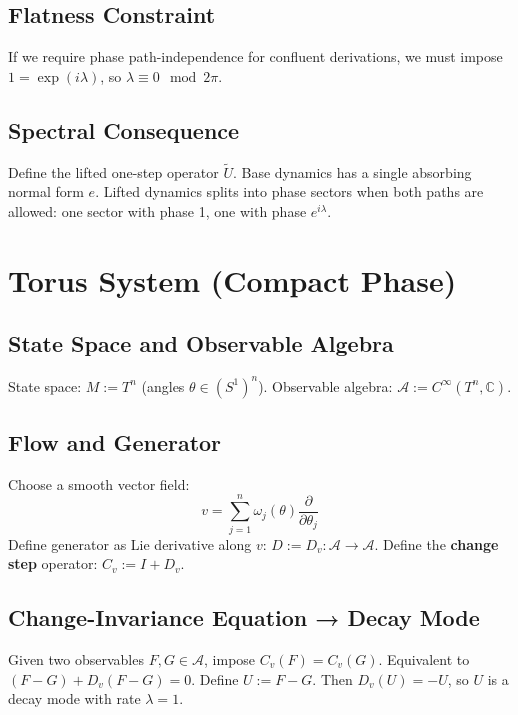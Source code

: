 \documentclass[12pt, oneside]{article}
\begin{document}
\subsection{Flatness Constraint}

If we require phase path-independence for confluent derivations, we must impose $1 = \exp(i\lambda)$, so $\lambda \equiv 0 \mod 2\pi$.

\subsection{Spectral Consequence}

Define the lifted one-step operator $\widetilde{U}$. Base dynamics has a single absorbing normal form $e$. Lifted dynamics splits into phase sectors when both paths are allowed: one sector with phase 1, one with phase $e^{i\lambda}$.

\section{Torus System (Compact Phase)}

\subsection{State Space and Observable Algebra}

State space: $M := T^n$ (angles $\theta \in (S^1)^n$). Observable algebra: $\mathcal{A} := C^\infty(T^n, \mathbb{C})$.

\subsection{Flow and Generator}

Choose a smooth vector field:
\begin{equation}
v = \sum_{j=1}^n \omega_j(\theta) \frac{\partial}{\partial \theta_j}
\end{equation}
Define generator as Lie derivative along $v$: $D := D_v: \mathcal{A} \rightarrow \mathcal{A}$. Define the \textbf{change step} operator: $C_v := I + D_v$.

\subsection{Change-Invariance Equation → Decay Mode}

Given two observables $F, G \in \mathcal{A}$, impose $C_v(F) = C_v(G)$. Equivalent to $(F-G) + D_v(F-G) = 0$. Define $U := F - G$. Then $D_v(U) = -U$, so $U$ is a decay mode with rate $\lambda = 1$.
\end{document}
